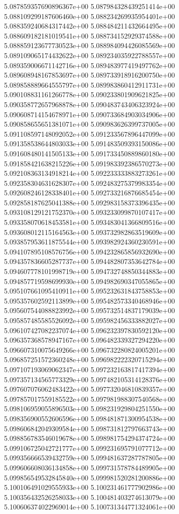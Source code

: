 5.087859357690896367e+00
5.087984328439251414e+00
5.088109299187606460e+00
5.088234269935954401e+00
5.088359240684317442e+00
5.088484211432664495e+00
5.088609182181019541e+00
5.088734152929374588e+00
5.088859123677730523e+00
5.088984094426085569e+00
5.089109065174432622e+00
5.089234035922788557e+00
5.089359006671142716e+00
5.089483977419497762e+00
5.089608948167853697e+00
5.089733918916200750e+00
5.089858889664555797e+00
5.089983860412911731e+00
5.090108831161266778e+00
5.090233801909621825e+00
5.090358772657968878e+00
5.090483743406323924e+00
5.090608714154678971e+00
5.090733684903034906e+00
5.090858655651381071e+00
5.090983626399737005e+00
5.091108597148092052e+00
5.091233567896447099e+00
5.091358538644803033e+00
5.091483509393150086e+00
5.091608480141505133e+00
5.091733450889860180e+00
5.091858421638215226e+00
5.091983392386570273e+00
5.092108363134918214e+00
5.092233333883273261e+00
5.092358304631628307e+00
5.092483275379983354e+00
5.092608246128338401e+00
5.092733216876685454e+00
5.092858187625041388e+00
5.092983158373396435e+00
5.093108129121752370e+00
5.093233099870107417e+00
5.093358070618453581e+00
5.093483041366809516e+00
5.093608012115164563e+00
5.093732982863519609e+00
5.093857953611875544e+00
5.093982924360230591e+00
5.094107895108576756e+00
5.094232865856932690e+00
5.094357836605287737e+00
5.094482807353642784e+00
5.094607778101998719e+00
5.094732748850344883e+00
5.094857719598699930e+00
5.094982690347055865e+00
5.095107661095410911e+00
5.095232631843758853e+00
5.095357602592113899e+00
5.095482573340468946e+00
5.095607544088823992e+00
5.095732514837179039e+00
5.095857485585526092e+00
5.095982456333882027e+00
5.096107427082237074e+00
5.096232397830592120e+00
5.096357368578947167e+00
5.096482339327294220e+00
5.096607310075649266e+00
5.096732280824005201e+00
5.096857251572360248e+00
5.096982222320715294e+00
5.097107193069062347e+00
5.097232163817417394e+00
5.097357134565773329e+00
5.097482105314128376e+00
5.097607076062483422e+00
5.097732046810839357e+00
5.097857017559185522e+00
5.097981988307540568e+00
5.098106959055896503e+00
5.098231929804251550e+00
5.098356900552606596e+00
5.098481871300954538e+00
5.098606842049309584e+00
5.098731812797663743e+00
5.098856783546019678e+00
5.098981754294374724e+00
5.099106725042721777e+00
5.099231695791077712e+00
5.099356666539432759e+00
5.099481637287787805e+00
5.099606608036134858e+00
5.099731578784489905e+00
5.099856549532845840e+00
5.099981520281200886e+00
5.100106491029555933e+00
5.100231461777902986e+00
5.100356432526258033e+00
5.100481403274613079e+00
5.100606374022969014e+00
5.100731344771324061e+00
